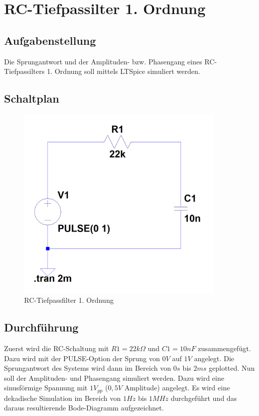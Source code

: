 \documentclass[12pt,a4paper,titlepage]{article}
\begin{document}
\newpage
\setcounter{tocdepth}{1}
\tableofcontents

\newpage
\section{RC-Tiefpassilter 1. Ordnung}

\subsection{Aufgabenstellung}
Die Sprungantwort und der Amplituden- bzw. Phasengang eines RC-Tiefpassilters 1. Ordnung soll mittels LTSpice simuliert werden.

\subsection{Schaltplan}

\begin{figure}[H]
  \centering
  \includegraphics[width=100mm]{filter01_schaltung.PNG}
  \caption{RC-Tiefpassfilter 1. Ordnung}
\end{figure}

\subsection{Durchführung}
Zuerst wird die RC-Schaltung mit $R1 = 22k\Omega$ und $C1 = 10nF$ zusammengefügt. Dazu wird mit der PULSE-Option der Sprung von $0V$ auf $1V$ angelegt. Die Sprungantwort des Systems wird dann im Bereich von $0s$ bis $2ms$ geplotted. Nun soll der Amplituden- und Phasengang simuliert werden. Dazu wird eine sinusförmige Spannung mit $1V_{pp}$ ($0,5V$ Amplitude) angelegt. Es wird eine dekadische Simulation im Bereich von $1Hz$ bis $1MHz$ durchgeführt und das daraus resultierende Bode-Diagramm aufgezeichnet.
\end{document}
